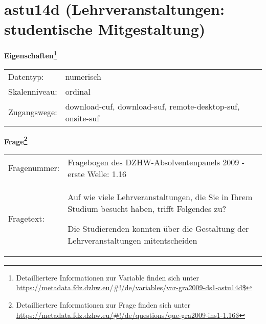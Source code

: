 
    \setcounter{footnote}{0}

    \vspace*{-1.8cm}
	\section{astu14d (Lehrveranstaltungen: studentische Mitgestaltung)}
	\label{section:astu14d}



    \vspace*{0.5cm}
    \noindent\textbf{Eigenschaften\footnote{Detailliertere Informationen zur Variable finden sich unter
		\url{https://metadata.fdz.dzhw.eu/\#!/de/variables/var-gra2009-ds1-astu14d$}}}\\
	\begin{tabularx}{\hsize}{@{}lX}
	Datentyp: & numerisch \\
	Skalenniveau: & ordinal \\
	Zugangswege: &
	  download-cuf, 
	  download-suf, 
	  remote-desktop-suf, 
	  onsite-suf
 \\
    \end{tabularx}



				\vspace*{0.5cm}
                \noindent\textbf{Frage\footnote{Detailliertere Informationen zur Frage finden sich unter
		              \url{https://metadata.fdz.dzhw.eu/\#!/de/questions/que-gra2009-ins1-1.16$}}}\\
				\begin{tabularx}{\hsize}{@{}lX}
					Fragenummer: &
					  Fragebogen des DZHW-Absolventenpanels 2009 - erste Welle:
					  1.16
 \\
					Fragetext: & Auf wie viele Lehrveranstaltungen, die Sie in Ihrem Studium besucht haben, trifft Folgendes zu?\par  Die Studierenden konnten über die Gestaltung der Lehrveranstaltungen mitentscheiden \\
				\end{tabularx}





